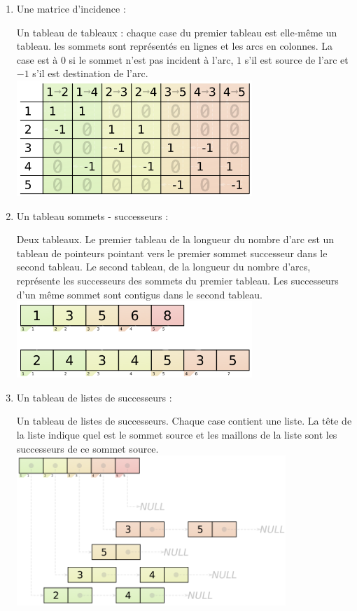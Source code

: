 \documentclass[11pt, a4paper]{report}
\begin{document}
	\pagebreak
	\begin{enumerate}
		\item Une matrice d'incidence :

		Un tableau de tableaux : chaque case du premier tableau est elle-même un tableau. les sommets sont représentés en lignes et les arcs en colonnes. La case est à $0$ si le sommet n'est pas incident à l'arc, $1$ s'il est source de l'arc et $-1$ s'il est destination de l'arc.\\
		\includegraphics[width=0.7\textwidth]{images/Matrice_incidence.png}\\

		\item Un tableau sommets - successeurs :

		Deux tableaux. Le premier tableau de la longueur du nombre d'arc est un tableau de pointeurs pointant vers le premier sommet successeur dans le second tableau. Le second tableau, de la longueur du nombre d'arcs, représente les successeurs des sommets du premier tableau. Les successeurs d'un même sommet sont contigus dans le second tableau.\\
		\includegraphics[width=0.7\textwidth]{images/tableau_pointeur_succ.png}\\

		\pagebreak
		\item Un tableau de listes de successeurs :

		Un tableau de listes de successeurs. Chaque case contient une liste. La tête de la liste indique quel est le sommet source et les maillons de la liste sont les successeurs de ce sommet source.\\
		\includegraphics[width=0.8\textwidth]{images/tableau_liste_succ.png}\\

	\end{enumerate}
\end{document}

